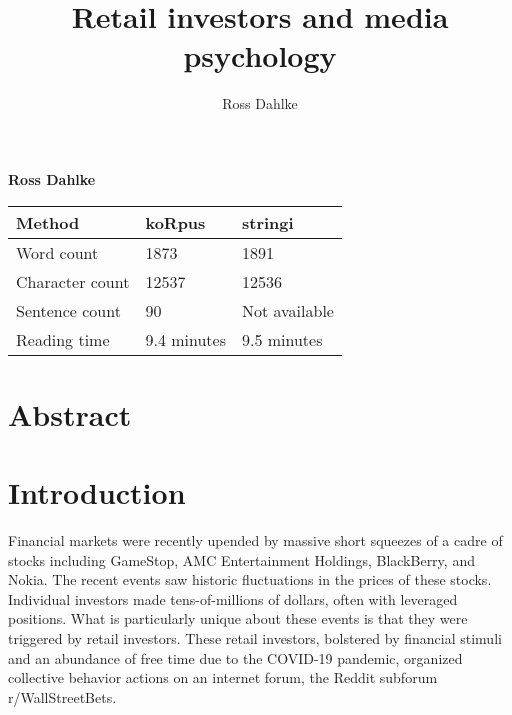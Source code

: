 \documentclass[12pt,]{article}
\title{Retail investors and media psychology  }
\author{\Large Ross Dahlke\vspace{0.05in} \newline\normalsize\emph{}  }
\date{}
\newcommand*{\authorfont}{\fontfamily{phv}\selectfont}
\begin{document}
	
%

{%
\setlength{\parindent}{0pt}
\thispagestyle{plain}
{\fontsize{18}{20}\selectfont\raggedright 
\maketitle  %

}

{
   \vskip 13.5pt\relax \normalsize\fontsize{11}{12} 
\textbf{\authorfont Ross Dahlke} \hskip 15pt \emph{\small }   

}

}






\vskip -8.5pt



\noindent \doublespacing 

\begin{longtable}[]{@{}lll@{}}
\toprule
Method & koRpus & stringi\tabularnewline
\midrule
\endhead
Word count & 1873 & 1891\tabularnewline
Character count & 12537 & 12536\tabularnewline
Sentence count & 90 & Not available\tabularnewline
Reading time & 9.4 minutes & 9.5 minutes\tabularnewline
\bottomrule
\end{longtable}

\hypertarget{abstract}{%
\section{Abstract}\label{abstract}}

\hypertarget{introduction}{%
\section{Introduction}\label{introduction}}

Financial markets were recently upended by massive short squeezes of a
cadre of stocks including GameStop, AMC Entertainment Holdings,
BlackBerry, and Nokia. The recent events saw historic fluctuations in
the prices of these stocks. Individual investors made tens-of-millions
of dollars, often with leveraged positions. What is particularly unique
about these events is that they were triggered by retail investors.
These retail investors, bolstered by financial stimuli and an abundance
of free time due to the COVID-19 pandemic, organized collective behavior
actions on an internet forum, the Reddit subforum r/WallStreetBets.
\end{document}
